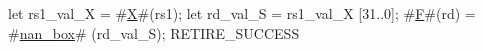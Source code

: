 let rs1_val_X            = #\hyperref[sailRISCVzX]{X}#(rs1);
let rd_val_S             = rs1_val_X [31..0];
#\hyperref[sailRISCVzF]{F}#(rd) = #\hyperref[sailRISCVznanzybox]{nan\_box}# (rd_val_S);
RETIRE_SUCCESS
